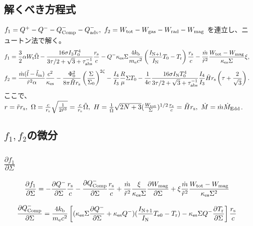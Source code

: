 \documentclass[11pt, oneside]{article}   	%
\begin{document}
\subsection{解くべき方程式}
$f_1 = Q^+ - Q^- - Q^-_{\rm Comp} - Q^-_{\rm adv},\  f_2 = W_{\rm tot} - W_{\rm gas} - W_{\rm rad} - W_{\rm mag}$ を連立し、ニュートン法で解く。
\begin{equation}
	f_1 = \frac{3}{2}\alpha W_{\rm t}\tilde\Omega - \frac{16\sigma I_3T_0^4}{3\tau/2 + \sqrt{3} + \tau_{\rm abs}^{-1}}\frac{r_{\rm s}}{c} - Q^-\kappa_{\rm es}\Sigma\frac{4k_{\rm b}}{m_{\rm e}c^2}\left( \frac{I_{\rm N+1}}{I_{\rm N}}T_0 - T_{\rm r}\right)\frac{r_{\rm s}}{c} -\frac{\dot{m}}{\tilde r^2}\frac{W_{\rm tot} - W_{\rm mag}}{\kappa_{\rm es}\Sigma}\xi,
\end{equation}
\begin{equation}
	f_2 = \frac{\dot{m}(\tilde{l} - \tilde{l}_{\rm in})}{\tilde r^2\alpha}\frac{c^2}{\kappa_{\rm es}} - \frac{\Phi_0^2}{8\pi \tilde Hr_{\rm s}}\left(\frac{\Sigma}{\Sigma_0}\right)^{2\zeta} - \frac{I_4}{I_3}\frac{R}{\mu}\Sigma T_0 - \frac{1}{4c}  \frac{16\sigma I_{\rm N}T_0^4}{3\tau/2 + \sqrt{3} + \tau_{\rm abs}^{-1}} \frac{I_4}{I_3}\tilde Hr_{\rm s}\left(\tau + \frac{2}{\sqrt{3}}\right).
\end{equation}
ここで、$r=\tilde rr_{\rm s},\ \Omega = \frac{c}{r_{\rm s}}\sqrt{\frac{1}{2\tilde r^3}} = \frac{c}{r_{\rm s}}\tilde\Omega,\ H = \frac{1}{\tilde\Omega}\sqrt{2N+3}(\frac{W_{\rm tot}}{\Sigma})^{1/2}\frac{r_{\rm s}}{c}=\tilde Hr_{\rm s},\ \dot{M}=\dot{m}\dot{M}_{\rm Edd}$.

\subsection{$f_1,f_2$の微分}
\subsection*{$\frac{\partial f_1}{\partial\Sigma}$}
\begin{equation}
	\frac{\partial f_1}{\partial \Sigma} = - \frac{\partial Q^-}{\partial\Sigma}\frac{r_{\rm s}}{c} - \frac{\partial Q^-_{\rm Comp}}{\partial\Sigma}\frac{r_{\rm s}}{c} + \frac{\dot{m}}{\tilde r^2}\frac{\xi}{\kappa_{\rm es}\Sigma}\frac{\partial W_{\rm mag}}{\partial\Sigma} + \xi\frac{\dot{m}}{\tilde r^2}\frac{W_{\rm tot}-W_{\rm mag}}{\kappa_{\rm es}\Sigma^2}
\end{equation}

\begin{equation}
	\frac{\partial Q^-_{\rm Comp}}{\partial\Sigma} = \frac{4k_{\rm b}}{m_{\rm e}c^2}\left[ (\kappa_{\rm es}\Sigma\frac{\partial Q^-}{\partial\Sigma} + \kappa_{\rm es}Q^-)(\frac{I_{\rm N+1}}{I_{\rm N}}T_{\rm e0} - T_{\rm r}) - \kappa_{\rm es}\Sigma Q^-\frac{\partial T_{\rm r}}{\partial\Sigma} \right]\frac{r_{\rm s}}{c}
\end{equation}
\end{document}
